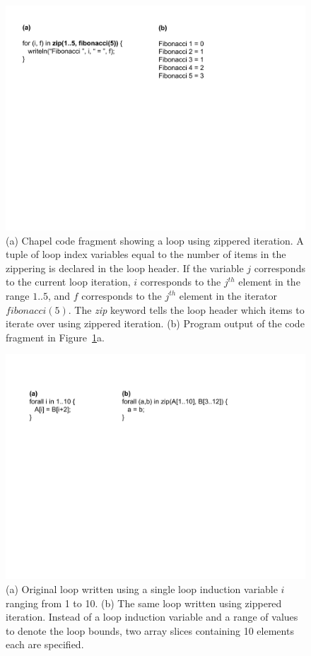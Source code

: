 \begin{figure}
	\begin{center}
	\includegraphics[scale=0.65]{./Figures/zippered_iteration}
	\caption{(a) Chapel code fragment showing a loop using zippered iteration. A tuple of loop index variables equal to the number of items in the zippering is declared in the loop header. If the variable $j$ corresponds to the current loop iteration, $i$ corresponds to the $j^{th}$ element in the range $1..5$, and $f$ corresponds to the $j^{th}$ element in the iterator $fibonacci(5)$. The \textit{zip} keyword tells the loop header which items to iterate over using zippered iteration. (b) Program output of the code fragment in Figure~\ref{zippered_iteration}a.}
	\label{zippered_iteration}
	\end{center}
\end{figure}

\begin{figure}
	\begin{center}
	\includegraphics[scale=0.60]{./Figures/affine_loop}
	\caption{(a) Original loop written using a single loop induction variable $i$ ranging from 1 to 10. (b) The same loop written using zippered iteration. Instead of a loop induction variable and a range of values to denote the loop bounds, two array slices containing 10 elements each are specified.}
	\label{affine_loop}
	\end{center}
\end{figure}